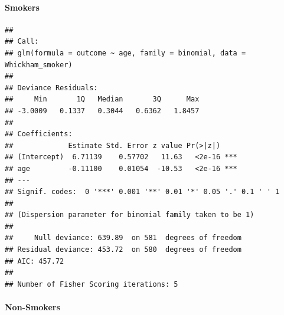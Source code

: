 \documentclass[]{article}
\newenvironment{Shaded}{\begin{snugshade}}{\end{snugshade}}
\newcommand{\DataTypeTok}[1]{\textcolor[rgb]{0.13,0.29,0.53}{#1}}
\newcommand{\KeywordTok}[1]{\textcolor[rgb]{0.13,0.29,0.53}{\textbf{#1}}}
\newcommand{\NormalTok}[1]{#1}
\newcommand{\OperatorTok}[1]{\textcolor[rgb]{0.81,0.36,0.00}{\textbf{#1}}}
\newcommand{\StringTok}[1]{\textcolor[rgb]{0.31,0.60,0.02}{#1}}
\let\oldparagraph\paragraph
\renewcommand{\paragraph}[1]{\oldparagraph{#1}\mbox{}}
\begin{document}
\hypertarget{smokers}{%
\paragraph{Smokers}\label{smokers}}

\begin{Shaded}
\end{Shaded}

\begin{verbatim}
## 
## Call:
## glm(formula = outcome ~ age, family = binomial, data = Whickham_smoker)
## 
## Deviance Residuals: 
##     Min       1Q   Median       3Q      Max  
## -3.0009   0.1337   0.3044   0.6362   1.8457  
## 
## Coefficients:
##             Estimate Std. Error z value Pr(>|z|)    
## (Intercept)  6.71139    0.57702   11.63   <2e-16 ***
## age         -0.11100    0.01054  -10.53   <2e-16 ***
## ---
## Signif. codes:  0 '***' 0.001 '**' 0.01 '*' 0.05 '.' 0.1 ' ' 1
## 
## (Dispersion parameter for binomial family taken to be 1)
## 
##     Null deviance: 639.89  on 581  degrees of freedom
## Residual deviance: 453.72  on 580  degrees of freedom
## AIC: 457.72
## 
## Number of Fisher Scoring iterations: 5
\end{verbatim}

\hypertarget{non-smokers}{%
\paragraph{Non-Smokers}\label{non-smokers}}

\begin{Shaded}
\end{Shaded}
\end{document}
